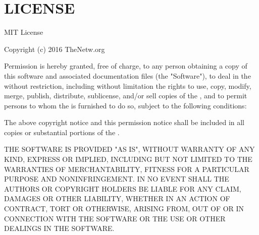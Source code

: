 \chapter{LICENSE}
\hypertarget{md_public_2glpi_2vendor_2thenetworg_2oauth2-azure_2_l_i_c_e_n_s_e}{}\label{md_public_2glpi_2vendor_2thenetworg_2oauth2-azure_2_l_i_c_e_n_s_e}
MIT License

Copyright (c) 2016 The\+Netw.\+org

Permission is hereby granted, free of charge, to any person obtaining a copy of this software and associated documentation files (the "{}\+Software"{}), to deal in the  without restriction, including without limitation the rights to use, copy, modify, merge, publish, distribute, sublicense, and/or sell copies of the , and to permit persons to whom the  is furnished to do so, subject to the following conditions\+:

The above copyright notice and this permission notice shall be included in all copies or substantial portions of the .

THE SOFTWARE IS PROVIDED "{}\+AS IS"{}, WITHOUT WARRANTY OF ANY KIND, EXPRESS OR IMPLIED, INCLUDING BUT NOT LIMITED TO THE WARRANTIES OF MERCHANTABILITY, FITNESS FOR A PARTICULAR PURPOSE AND NONINFRINGEMENT. IN NO EVENT SHALL THE AUTHORS OR COPYRIGHT HOLDERS BE LIABLE FOR ANY CLAIM, DAMAGES OR OTHER LIABILITY, WHETHER IN AN ACTION OF CONTRACT, TORT OR OTHERWISE, ARISING FROM, OUT OF OR IN CONNECTION WITH THE SOFTWARE OR THE USE OR OTHER DEALINGS IN THE SOFTWARE. 